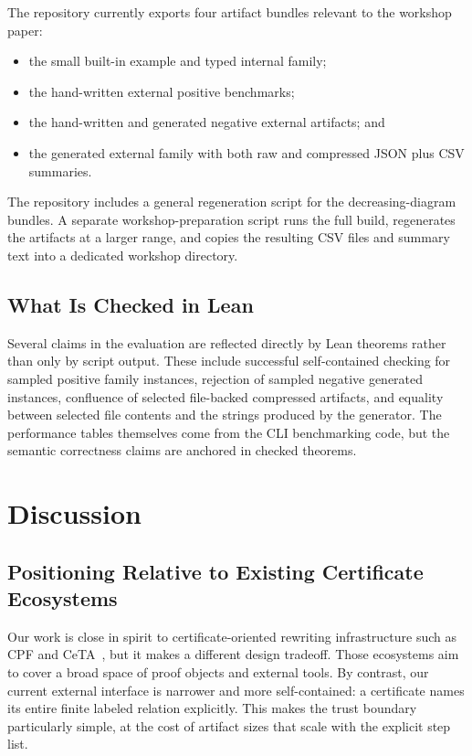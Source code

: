 \documentclass[submission,copyright,creativecommons]{eptcs}
\newcommand{\lean}{Lean\xspace}
\begin{document}
The repository currently exports four artifact bundles relevant to the workshop
paper:
\begin{itemize}
\item the small built-in example and typed internal family;
\item the hand-written external positive benchmarks;
\item the hand-written and generated negative external artifacts; and
\item the generated external family with both raw and compressed JSON plus CSV
  summaries.
\end{itemize}
The repository includes a general regeneration script for the decreasing-diagram
bundles. A separate workshop-preparation script runs the full build,
regenerates the artifacts at a larger range, and copies the resulting CSV files
and summary text into a dedicated workshop directory.

\subsection{What Is Checked in Lean}

Several claims in the evaluation are reflected directly by \lean theorems rather
than only by script output. These include successful self-contained checking for
sampled positive family instances, rejection of sampled negative generated
instances, confluence of selected file-backed compressed artifacts, and equality
between selected file contents and the strings produced by the generator. The
performance tables themselves come from the CLI benchmarking code, but the
semantic correctness claims are anchored in checked theorems.

\section{Discussion}

\subsection{Positioning Relative to Existing Certificate Ecosystems}

Our work is close in spirit to certificate-oriented rewriting infrastructure
such as CPF and CeTA~\cite{sternagel2014,thiemann2009}, but it makes a
different design tradeoff. Those ecosystems aim to cover a broad space of proof
objects and external tools. By contrast, our current external interface is
narrower and more self-contained: a certificate names its entire finite labeled
relation explicitly. This makes the trust boundary particularly simple, at the
cost of artifact sizes that scale with the explicit step list.
\end{document}
